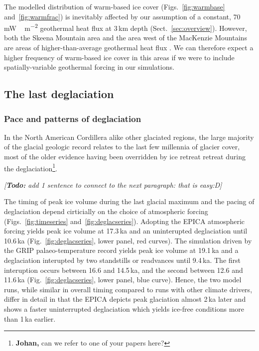 \documentclass[tc, manuscript]{copernicus}
\newcommand{\todo}[1]{\emph{[\textbf{Todo:} #1]}}
\begin{document}
The modelled distribution of warm-based ice cover (Figs.~\ref{fig:warmbase}
and~\ref{fig:warmfrac}) is inevitably affected by our assumption of a constant,
70\,\unit{mW\,m^{-2}} geothermal heat flux at 3\,km depth
(Sect.~\ref{sec:overview}). However, both the Skeena Mountain area and the area
west of the MacKenzie Mountains are areas of higher-than-average geothermal
heat flux \citep{Blackwell.Richards.2004}. We can therefore expect a higher
frequency of warm-based ice cover in this areas if we were to include
spatially-variable geothermal forcing in our simulations.


\subsection{The last deglaciation}

\subsubsection{Pace and patterns of deglaciation}

In the North American Cordillera alike other glaciated regions, the large
majority of the glacial geologic record relates to the last few millennia of
glacier cover, most of the older evidence having been overridden by ice retreat
retreat during the deglaciation\footnote{\textbf{Johan,} can we refer to one
of your papers here?}.

\todo{add 1 sentence to connect to the next paragraph: that is easy:D}

The timing of peak ice volume during the last glacial maximum and the pacing of
deglaciation depend cirticially on the choice of atmospheric forcing
(Figs.~\ref{fig:timeseries} and~\ref{fig:deglacseries}). Adopting the EPICA
atmospheric forcing yields peak ice volume at 17.3\,ka and an uninterupted
deglaciation until 10.6\,ka (Fig.~\ref{fig:deglacseries}, lower panel, red
curves). The simulation driven by the GRIP palaeo-temperature record yields
peak ice volume at 19.1\,ka and a deglaciation interupted by two standstills or
readvances until 9.4\,ka. The first interuption occurs between 16.6 and
14.5\,ka, and the second between 12.6 and 11.6\,ka
(Fig.~\ref{fig:deglacseries}, lower panel, blue curve). Hence, the two model
runs, while similar in overall timing compared to runs with other climate
drivers, differ in detail in that the EPICA depicts peak glaciation almost
2\,ka later and shows a faster uninterrupted deglaciation which yields ice-free
conditions more than 1\,ka earlier.
\end{document}
